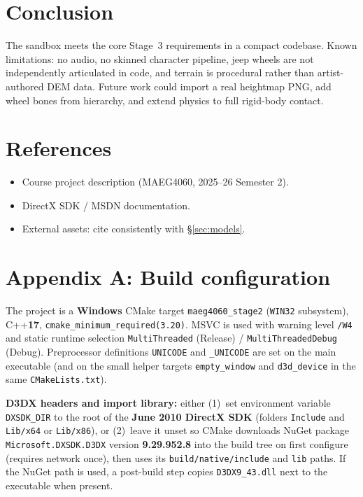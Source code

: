 \documentclass[11pt,a4paper]{article}
\begin{document}
\endgroup

\section{Conclusion}
\label{sec:conclusion}
The sandbox meets the core Stage~3 requirements in a compact codebase. Known limitations: no audio, no skinned character pipeline, jeep wheels are not independently articulated in code, and terrain is procedural rather than artist-authored DEM data. Future work could import a real heightmap PNG, add wheel bones from hierarchy, and extend physics to full rigid-body contact.

\section{References}
\begingroup
\sloppy
\setlength{\emergencystretch}{4em}
\begin{itemize}
  \item Course project description (MAEG4060, 2025--26 Semester 2).
  \item DirectX SDK / MSDN documentation.
  \item External assets: cite consistently with \S\ref{sec:models}.
\end{itemize}
\endgroup

\appendix

\section{Appendix A: Build configuration}
\label{app:build}

The project is a \textbf{Windows} CMake target \texttt{maeg4060\_stage2} (\texttt{WIN32} subsystem), C++\textbf{17}, \texttt{cmake\_minimum\_required(3.20)}. MSVC is used with warning level \texttt{/W4} and static runtime selection \texttt{MultiThreaded} (Release) / \texttt{MultiThreadedDebug} (Debug). Preprocessor definitions \texttt{UNICODE} and \texttt{\_UNICODE} are set on the main executable (and on the small helper targets \texttt{empty\_window} and \texttt{d3d\_device} in the same \texttt{CMakeLists.txt}).

\textbf{D3DX headers and import library:} either (1)~set environment variable \texttt{DXSDK\_DIR} to the root of the \textbf{June 2010 DirectX SDK} (folders \texttt{Include} and \texttt{Lib/x64} or \texttt{Lib/x86}), or (2)~leave it unset so CMake downloads NuGet package \texttt{Microsoft.DXSDK.D3DX} version \textbf{9.29.952.8} into the build tree on first configure (requires network once), then uses its \texttt{build/native/include} and \texttt{lib} paths. If the NuGet path is used, a post-build step copies \texttt{D3DX9\_43.dll} next to the executable when present.
\end{document}
